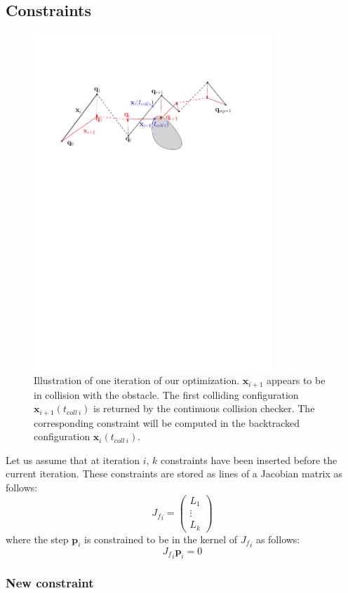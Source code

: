\documentclass{tADR2e}
\newcommand\p{\mathbf{p}}
\newcommand\xx{\mathbf{x}} %
\newcommand\tcolli{t_{coll\ i}}
\newcommand\Jf{{J_f}}
\begin{document}
\subsection{Constraints}

\begin{figure}
	\centering
	\includegraphics[width=9cm]{optim_grad.pdf}
	\caption{Illustration of one iteration of our optimization. $\xx_{i+1}$ 
	appears 
	to be in collision with the obstacle. The first colliding configuration 
	$\xx_{i+1}(\tcolli)$ is returned by the continuous collision checker. The 
	corresponding constraint will be computed in the backtracked configuration 
	$\xx_{i}(\tcolli)$.}
	\label{optim_grad}
\end{figure}

Let us assume that at iteration $i$, $k$ constraints have been inserted before the current iteration. 
These constraints are stored as lines of a Jacobian matrix as follows:
$$
\Jf_{i} = \left(\begin{array}{c}L_1 \\ \vdots \\ L_k\end{array}\right)
$$
where the step $\p_i$ is constrained to be in the kernel of $\Jf_{i}$ as follows:
$$
\Jf_{i} \p_i = 0
$$

\subsubsection{New constraint}
\end{document}

